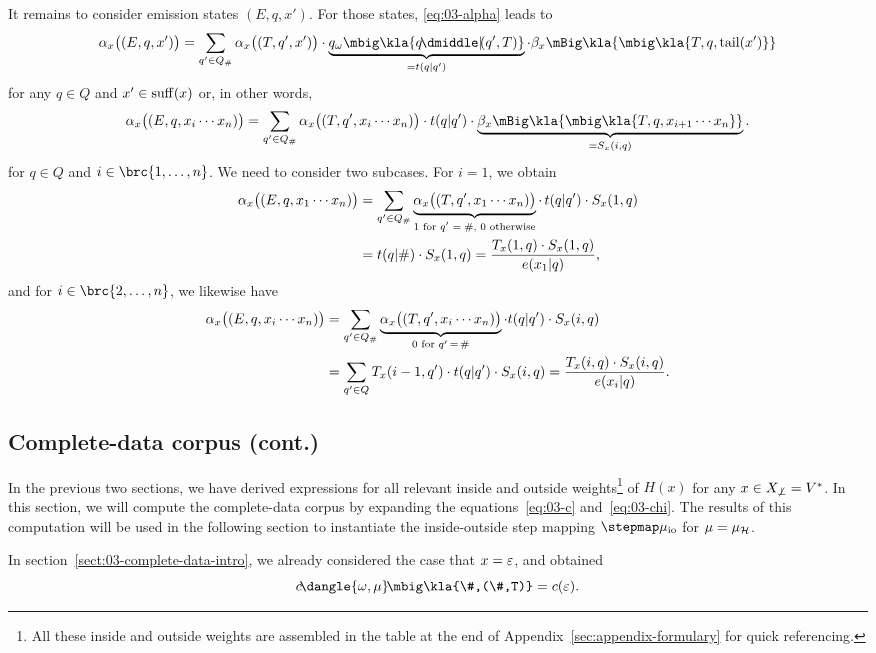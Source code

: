 It remains to consider emission states $(E,q,x')$. For those states, \eqref{eq:03-alpha} leads to
\[
 \alpha_x\doublekla{E,q,x'} = \sum_{q'\in Q_\#} \alpha_x\doublekla{T,q',x'} \cdot \underbrace{q_\omega\mbig\kla{q\npipe(q',T)}}_{=t(q|q')} \cdot \beta_x\mBig\kla{\mbig\kla{T,q,\cdr(x')}}
\]
for any $q\in Q$ and $x'\in\operatorname{suff}(x)$ or, in other words,
\[
 \alpha_x\doublekla{E,q,x_i\cdots x_n} = \sum_{q'\in Q_\#} \alpha_x\doublekla{T,q',x_i\cdots x_n} \cdot t(q|q') \cdot \underbrace{\beta_x\mBig\kla{\mbig\kla{T,q,x_{i+1}\cdots x_n}}}_{=S_x(i,q)}.
\]
for $q\in Q$ and $i\in\brc{1,\ldots,n}$. We need to consider two subcases. For $i=1$, we obtain
\begin{align*}
 \alpha_x\bigl((E,q,x_1\cdots x_n)\bigr)
 &= \sum_{q'\in Q_\#} \underbrace{\alpha_x\bigl((T,q',x_1\cdots x_n)\bigr)}_{\text{$1$ for $q'=\#$, $0$ otherwise}} \cdot\, t(q|q') \cdot S_x(1,q) \\
 &= t(q|\#) \cdot S_x(1,q)
 = \frac{T_x(1,q) \cdot S_x(1,q)}{e(x_1|q)},
\end{align*}
and for $i\in\brc{2,\ldots,n}$, we likewise have
\begin{align*}
 \alpha_x\bigl((E,q,x_i\cdots x_n)\bigr)
 &= \sum_{q'\in Q_\#} \underbrace{\alpha_x\bigl((T,q',x_i\cdots x_n)\bigr)}_{0\text{ for }q'\,=\,\#} \cdot t(q|q') \cdot S_x(i,q) \\
 &= \sum_{q'\in Q} T_x(i-1,q') \cdot t(q|q') \cdot S_x(i,q)
 = \frac{T_x(i,q) \cdot S_x(i,q)}{e(x_i|q)}.
\end{align*}

\subsection{Complete-data corpus (cont.)}\label{sect:03-complete-data}

In the previous two sections, we have derived expressions for all relevant
inside and outside weights\footnote{All these inside and outside weights are
assembled in the table at the end of Appendix~\ref{sec:appendix-formulary} for quick
referencing.} of $H(x)$ for any $x\in X_{\not\bot}=V^*$. In this section, we will
compute the complete-data corpus by expanding the equations~\eqref{eq:03-c}
and~\eqref{eq:03-chi}. The results of this computation will be used in the
following section to instantiate the inside-outside step mapping
$\stepmap\mu_\mathrm{io}$ for $\mu=\mu_\mathcal H$.

In section~\ref{sect:03-complete-data-intro}, we already considered the case
that $x=\varepsilon$, and obtained
\[
 c\!\dangle{\omega,\mu}\!\mbig\kla{\#,(\#,T)} = c(\eps).
\]


